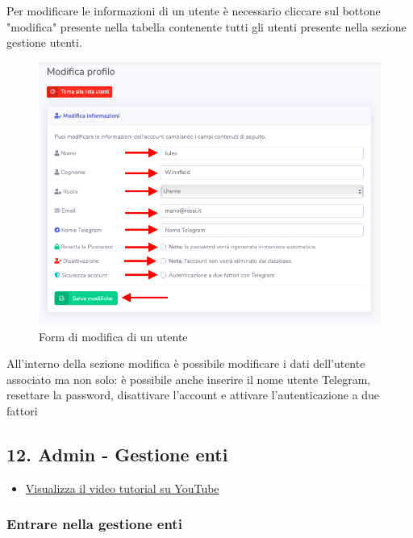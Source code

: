 		Per modificare le informazioni di un utente è necessario cliccare sul bottone "modifica" presente nella tabella contenente tutti gli utenti presente nella sezione gestione utenti.

		\begin{figure}[H]
		\centering
		\includegraphics[scale=0.600]{res/images/admin/modUtente.png}
		\caption{Form di modifica di un utente}
	\end{figure}

		All'interno della sezione modifica è possibile modificare i dati dell'utente associato ma non solo: è possibile anche inserire il nome utente Telegram, resettare la password, disattivare l'account e attivare l'autenticazione a due fattori

\newpage \subsection{12. Admin - Gestione enti}

	\begin{itemize}
		\item \href{https://www.youtube.com/watch?v=PjySMOLCtMA&list=PLPKYjnuIh1FA3b3jn_bwY_ztYzaFn2mIT&index=15}{Visualizza il video tutorial su YouTube} 
	\end{itemize}
	
	\subsubsection{Entrare nella gestione enti}

